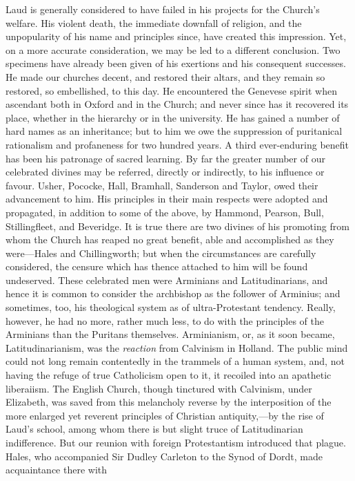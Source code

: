 Laud is generally considered to have failed in his
projects for the Church's welfare. His violent death, the immediate
downfall of religion, and the unpopularity of his name and principles
since, have created this impression. Yet, on a more accurate
consideration, we may be led to a different conclusion. Two specimens
have already been given of his exertions and his consequent successes.
He made our churches decent, and restored their altars, and they remain
so restored, so embellished, to this day. He encountered the Genevese
spirit when ascendant both in Oxford and in the Church; and never since
has it recovered its place, whether in the hierarchy or in the
university. He has gained a number of hard names as an inheritance; but
to him we owe the suppression of puritanical rationalism and profaneness
for two hundred years. A third ever-enduring benefit has been his
patronage of sacred learning. By far the greater number of our
celebrated divines may be referred, directly or indirectly, to his
influence or favour. Usher, Pococke, Hall, Bramhall, Sanderson and
Taylor, owed their advancement to him. His principles in their main
respects were adopted and propagated, in addition to some of the above,
by Hammond, Pearson, Bull, Stillingfleet, and Beveridge. It is true
there are two divines of his promoting from whom the Church has reaped
no great benefit, able and accomplished as they were—Hales and
Chillingworth; but when the circumstances are carefully considered, the
censure which has thence attached to him will be found undeserved. These
celebrated men were Arminians and Latitudinarians, and hence it is
common to consider the archbishop as the follower of Arminius; and
sometimes, too, his theological system as of ultra-Protestant tendency.
Really, however, he had no more, rather much less, to do with the
principles of the Arminians than the Puritans themselves.
Arminianism, or, as it soon became, Latitudinarianism, was the \emph{reaction}
from Calvinism in Holland. The public mind could not long remain
contentedly in the trammels of a human system, and, not having the
refuge of true Catholicism open to it, it recoiled into an apathetic
liberaiism. The English Church, though tinctured with Calvinism, under
Elizabeth, was saved from this melancholy reverse by the interposition
of the more enlarged yet reverent principles of Christian
antiquity,—by the rise of Laud's school, among whom there is but
slight truce of Latitudinarian indifference. But our reunion with
foreign Protestantism introduced that plague. Hales, who accompanied Sir
Dudley Carleton to the Synod of Dordt, made acquaintance there with
